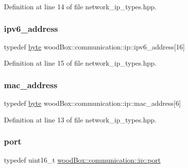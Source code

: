 Definition at line 14 of file network\+\_\+ip\+\_\+types.\+hpp.

\mbox{\label{namespacewood_box_1_1communication_1_1ip_a2b9a62d13acf84460a39258276c520a5}} 
\subsubsection{\texorpdfstring{ipv6\+\_\+address}{ipv6\_address}}
{\footnotesize\ttfamily typedef \mbox{\hyperlink{namespacewood_box_1_1communication_1_1ip_af1b00b9755ebc1bbeb6b5be2068bb421}{byte}} wood\+Box\+::communication\+::ip\+::ipv6\+\_\+address\mbox{[}16\mbox{]}}



Definition at line 15 of file network\+\_\+ip\+\_\+types.\+hpp.

\mbox{\label{namespacewood_box_1_1communication_1_1ip_a77e0ff862f91fee5e1885c9f05c2439e}} 
\subsubsection{\texorpdfstring{mac\+\_\+address}{mac\_address}}
{\footnotesize\ttfamily typedef \mbox{\hyperlink{namespacewood_box_1_1communication_1_1ip_af1b00b9755ebc1bbeb6b5be2068bb421}{byte}} wood\+Box\+::communication\+::ip\+::mac\+\_\+address\mbox{[}6\mbox{]}}



Definition at line 13 of file network\+\_\+ip\+\_\+types.\+hpp.

\mbox{\label{namespacewood_box_1_1communication_1_1ip_a60d560dd3f44a2de58c7e8209e94e345}} 
\subsubsection{\texorpdfstring{port}{port}}
{\footnotesize\ttfamily typedef uint16\+\_\+t \mbox{\hyperlink{namespacewood_box_1_1communication_1_1ip_a60d560dd3f44a2de58c7e8209e94e345}{wood\+Box\+::communication\+::ip\+::port}}}



